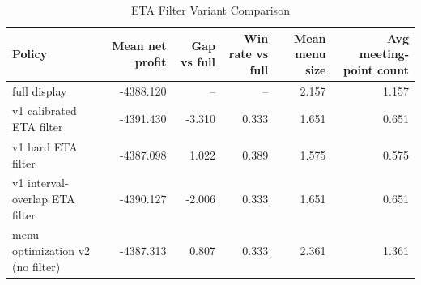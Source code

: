 \begin{table}[t]
\centering
\caption{ETA Filter Variant Comparison}
\label{tab:filtering_baselines}
\begin{tabular}{lrrrrr}
\hline
Policy & Mean net profit & Gap vs full & Win rate vs full & Mean menu size & Avg meeting-point count \\
\hline
full display & -4388.120 & -- & -- & 2.157 & 1.157 \\
v1 calibrated ETA filter & -4391.430 & -3.310 & 0.333 & 1.651 & 0.651 \\
v1 hard ETA filter & -4387.098 & 1.022 & 0.389 & 1.575 & 0.575 \\
v1 interval-overlap ETA filter & -4390.127 & -2.006 & 0.333 & 1.651 & 0.651 \\
menu optimization v2 (no filter) & -4387.313 & 0.807 & 0.333 & 2.361 & 1.361 \\
\hline
\end{tabular}
\end{table}
